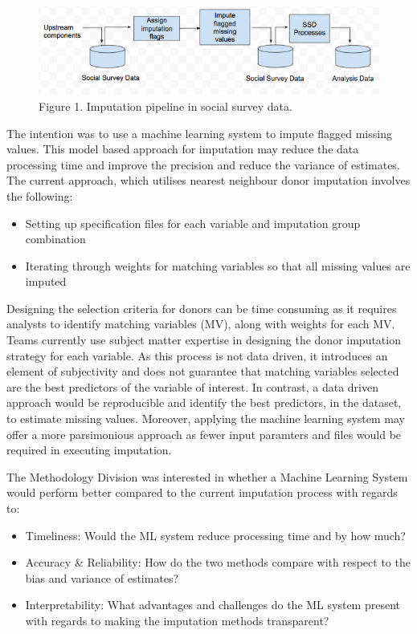 \documentclass[]{book}
\providecommand{\tightlist}{%
  \setlength{\itemsep}{0pt}\setlength{\parskip}{0pt}}
\begin{document}
\begin{figure}
\centering
\includegraphics{images/CurrentPipeline.png}
\caption{Figure 1. Imputation pipeline in social survey data.}
\end{figure}

The intention was to use a machine learning system to impute flagged
missing values. This model based approach for imputation may reduce the
data processing time and improve the precision and reduce the variance
of estimates. The current approach, which utilises nearest neighbour
donor imputation involves the following:

\begin{itemize}
\tightlist
\item
  Setting up specification files for each variable and imputation group
  combination\\
\item
  Iterating through weights for matching variables so that all missing
  values are imputed
\end{itemize}

Designing the selection criteria for donors can be time consuming as it
requires analysts to identify matching variables (MV), along with
weights for each MV. Teams currently use subject matter expertise in
designing the donor imputation strategy for each variable. As this
process is not data driven, it introduces an element of subjectivity and
does not guarantee that matching variables selected are the best
predictors of the variable of interest. In contrast, a data driven
approach would be reproducible and identify the best predictors, in the
dataset, to estimate missing values. Moreover, applying the machine
learning system may offer a more parsimonious approach as fewer input
paramters and files would be required in executing imputation.

The Methodology Division was interested in whether a Machine Learning
System would perform better compared to the current imputation process
with regards to:

\begin{itemize}
\tightlist
\item
  Timeliness: Would the ML system reduce processing time and by how
  much?\\
\item
  Accuracy \& Reliability: How do the two methods compare with respect
  to the bias and variance of estimates?\\
\item
  Interpretability: What advantages and challenges do the ML system
  present with regards to making the imputation methods transparent?
\end{itemize}
\end{document}

